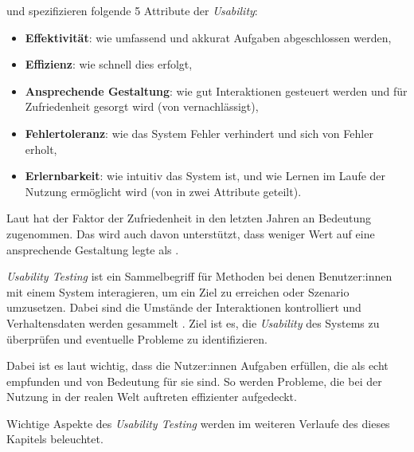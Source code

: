 \textcite{quesenberyDimensionsUsability2003} und \textcite{nielsenUsabilityEngineering1994} spezifizieren folgende 5 Attribute der \textit{Usability}:
\begin{itemize}
  \item \textbf{Effektivität}: wie umfassend und akkurat Aufgaben abgeschlossen werden,
  \item \textbf{Effizienz}: wie schnell dies erfolgt,
  \item \textbf{Ansprechende Gestaltung}: wie gut Interaktionen gesteuert werden und für Zufriedenheit gesorgt wird (von \citeauthor{nielsenUsabilityEngineering1994} vernachlässigt),
  \item \textbf{Fehlertoleranz}: wie das System Fehler verhindert und sich von Fehler erholt,
  \item \textbf{Erlernbarkeit}: wie intuitiv das System ist, und wie Lernen im Laufe der Nutzung ermöglicht wird (von \citeauthor{nielsenUsabilityEngineering1994} in zwei Attribute geteilt).
\end{itemize}
Laut \textcite{barnumUsabilityTesting2021} hat der Faktor der Zufriedenheit in den letzten Jahren an Bedeutung zugenommen. Das wird auch davon unterstützt, dass \textcite{nielsenUsabilityEngineering1994} weniger Wert auf eine ansprechende Gestaltung legte als \textcite{quesenberyDimensionsUsability2003}.

\newpage

\textit{Usability Testing} ist ein Sammelbegriff für Methoden bei denen Benutzer:innen mit einem System interagieren, um ein Ziel zu erreichen oder Szenario umzusetzen. Dabei sind die Umstände der Interaktionen kontrolliert und Verhaltensdaten werden gesammelt \parencite{wichanskyUsabilityTesting2000}. Ziel ist es, die \textit{Usability} des Systems zu überprüfen und eventuelle Probleme zu identifizieren.

Dabei ist es laut \textcite{barnumUsabilityTesting2021} wichtig, dass die Nutzer:innen Aufgaben erfüllen, die als echt empfunden und von Bedeutung für sie sind. So werden Probleme, die bei der Nutzung in der realen Welt auftreten effizienter aufgedeckt.

Wichtige Aspekte des \textit{Usability Testing} werden im weiteren Verlaufe des dieses Kapitels beleuchtet.
